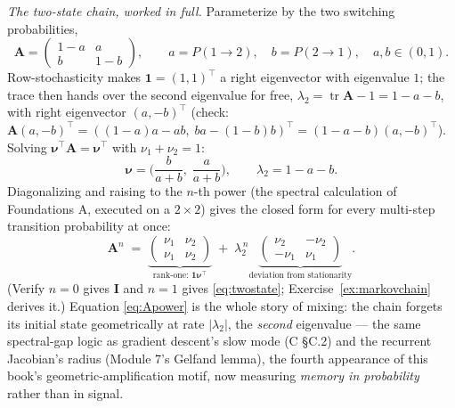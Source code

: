 \documentclass[11pt]{article}
\numberwithin{equation}{section}
\theoremstyle{plain}
\theoremstyle{definition}
\theoremstyle{remark}
\DeclareMathOperator{\tr}{tr}
\newcommand{\T}{\top}
\newcommand{\bA}{\bm{A}}
\newcommand{\bnu}{\bm{\nu}}
\begin{document}
\emph{The two-state chain, worked in full.} Parameterize by the two switching probabilities,
\begin{equation}
\bA = \begin{pmatrix} 1 - a & a \\ b & 1 - b \end{pmatrix},
\qquad a = P(1 \to 2), \quad b = P(2 \to 1), \quad a, b \in (0, 1).
\label{eq:twostate}
\end{equation}
Row-stochasticity makes $\bm 1 = (1,1)^\T$ a right eigenvector with eigenvalue $1$; the trace then hands over the second eigenvalue for free, $\lambda_2 = \tr \bA - 1 = 1 - a - b$, with right eigenvector $(a, -b)^\T$ (check: $\bA (a, -b)^\T = ((1-a)a - ab,\; ba - (1-b)b)^\T = (1 - a - b)(a, -b)^\T$). Solving $\bnu^\T \bA = \bnu^\T$ with $\nu_1 + \nu_2 = 1$:
\begin{equation}
\bnu = \Big( \frac{b}{a + b},\; \frac{a}{a + b} \Big),
\qquad
\lambda_2 = 1 - a - b .
\label{eq:twostationary}
\end{equation}
Diagonalizing and raising to the $n$-th power (the spectral calculation of Foundations A, executed on a $2 \times 2$) gives the closed form for every multi-step transition probability at once:
\begin{equation}
\bA^n \;=\;
\underbrace{\begin{pmatrix} \nu_1 & \nu_2 \\ \nu_1 & \nu_2 \end{pmatrix}}_{\text{rank-one: } \bm 1 \bnu^\T}
\;+\; \lambda_2^{\,n}
\underbrace{\begin{pmatrix} \nu_2 & -\nu_2 \\ -\nu_1 & \nu_1 \end{pmatrix}}_{\text{deviation from stationarity}} .
\label{eq:Apower}
\end{equation}
(Verify $n = 0$ gives $\bm I$ and $n = 1$ gives \eqref{eq:twostate}; Exercise~\ref{ex:markovchain} derives it.) Equation \eqref{eq:Apower} is the whole story of mixing: the chain forgets its initial state geometrically at rate $|\lambda_2|$, the \emph{second} eigenvalue --- the same spectral-gap logic as gradient descent's slow mode (C \S C.2) and the recurrent Jacobian's radius (Module 7's Gelfand lemma), the fourth appearance of this book's geometric-amplification motif, now measuring \emph{memory in probability} rather than in signal.
\end{document}
